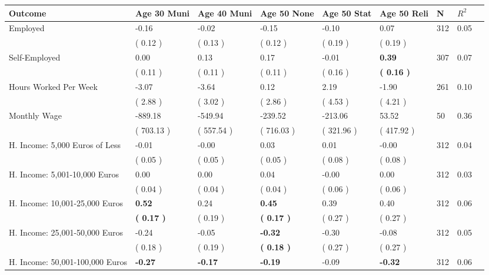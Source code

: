 \begin{tabular}{L{6.2cm} C{1.8cm} C{1.8cm} C{1.8cm} C{1.8cm} C{1.8cm} C{1.8cm} C{0.3cm} C{0.3cm}}
\toprule
 \textbf{Outcome} & \textbf{Age 30 Muni} & \textbf{Age 40 Muni} & \textbf{Age 50 None} & \textbf{Age 50 Stat} & \textbf{Age 50 Reli} & \textbf{N} & \textbf{$ R^2$} \\
\midrule
Employed &     -0.16 &     -0.02 &     -0.15 &     -0.10 &      0.07  & 312 &       0.05 \\ 
 & (     0.12 ) & (     0.13 ) & (     0.12 ) & (     0.19 ) & (     0.19 )  & \\
Self-Employed &      0.00 &      0.13 &      0.17 &     -0.01 & \textbf{     0.39}  & 307 &       0.07 \\ 
 & (     0.11 ) & (     0.11 ) & (     0.11 ) & (     0.16 ) & \textbf{(     0.16 )}  & \\
Hours Worked Per Week &     -3.07 &     -3.64 &      0.12 &      2.19 &     -1.90  & 261 &       0.10 \\ 
 & (     2.88 ) & (     3.02 ) & (     2.86 ) & (     4.53 ) & (     4.21 )  & \\
Monthly Wage &   -889.18 &   -549.94 &   -239.52 &   -213.06 &     53.52  & 50 &       0.36 \\ 
 & (   703.13 ) & (   557.54 ) & (   716.03 ) & (   321.96 ) & (   417.92 )  & \\
H. Income: 5,000 Euros of Less &     -0.01 &     -0.00 &      0.03 &      0.01 &     -0.00  & 312 &       0.04 \\ 
 & (     0.05 ) & (     0.05 ) & (     0.05 ) & (     0.08 ) & (     0.08 )  & \\
H. Income: 5,001-10,000 Euros &      0.00 &      0.00 &      0.04 &     -0.00 &      0.00  & 312 &       0.03 \\ 
 & (     0.04 ) & (     0.04 ) & (     0.04 ) & (     0.06 ) & (     0.06 )  & \\
H. Income: 10,001-25,000 Euros & \textbf{     0.52} &      0.24 & \textbf{     0.45} &      0.39 &      0.40  & 312 &       0.06 \\ 
 & \textbf{(     0.17 )} & (     0.19 ) & \textbf{(     0.17 )} & (     0.27 ) & (     0.27 )  & \\
H. Income: 25,001-50,000 Euros &     -0.24 &     -0.05 & \textbf{    -0.32} &     -0.30 &     -0.08  & 312 &       0.05 \\ 
 & (     0.18 ) & (     0.19 ) & \textbf{(     0.18 )} & (     0.27 ) & (     0.27 )  & \\
H. Income: 50,001-100,000 Euros & \textbf{    -0.27} & \textbf{    -0.17} & \textbf{    -0.19} &     -0.09 & \textbf{    -0.32}  & 312 &       0.06 \\ 

\end{tabular}
